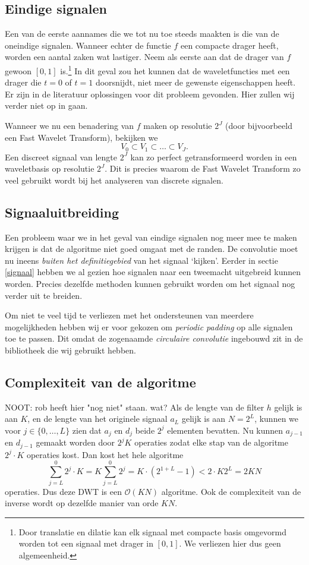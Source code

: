\documentclass[11pt]{uvamath}
\theoremstyle{plain}
\theoremstyle{definition}
\theoremstyle{remark}
\begin{document}
\subsection{Eindige signalen}
Een van de eerste aannames die we tot nu toe steeds maakten is die van de oneindige signalen. Wanneer echter de functie $f$ een compacte drager heeft, worden een aantal zaken wat lastiger. Neem als eerste aan dat de drager van $f$ gewoon $[0,1]$ is.\footnote{Door translatie en dilatie kan elk signaal met compacte basis omgevormd worden tot een signaal met drager in $[0,1]$. We verliezen hier dus geen algemeenheid.} In dit geval zou het kunnen dat de waveletfuncties met een drager die $t=0$ of $t=1$ doorsnijdt, niet meer de gewenste eigenschappen heeft. Er zijn in de literatuur oplossingen voor dit probleem gevonden. Hier zullen wij verder niet op in gaan.

Wanneer we nu een benadering van $f$ maken op resolutie $2^J$ (door bijvoorbeeld een Fast Wavelet Transform), bekijken we
\[
V_0 \subset V_{1} \subset \ldots \subset V_{J}.
\]
Een discreet signaal van lengte $2^{J}$ kan zo perfect getransformeerd worden in een waveletbasis op resolutie $2^{J}$. Dit is precies waarom de Fast Wavelet Transform zo veel gebruikt wordt bij het analyseren van discrete signalen.

\subsection{Signaaluitbreiding}
Een probleem waar we in het geval van eindige signalen nog meer mee te maken krijgen is dat de algoritme niet goed omgaat met de randen. De convolutie moet nu ineens \emph{buiten het definitiegebied} van het signaal `kijken'. Eerder in sectie \ref{signaal} hebben we al gezien hoe signalen naar een tweemacht uitgebreid kunnen worden. Precies dezelfde methoden kunnen gebruikt worden om het signaal nog verder uit te breiden.

Om niet te veel tijd te verliezen met het ondersteunen van meerdere mogelijkheden hebben wij er voor gekozen om \emph{periodic padding} op alle signalen toe te passen. Dit omdat de zogenaamde \emph{circulaire convolutie} ingebouwd zit in de bibliotheek die wij gebruikt hebben.

\subsection{Complexiteit van de algoritme}
NOOT: rob heeft hier "nog niet" staan. wat?
Als de lengte van de filter $h$ gelijk is aan $K$, en de lengte van het originele signaal $a_L$ gelijk is aan $N = 2^{L}$, kunnen we voor $j \in \{0, \ldots, L\}$ zien dat $a_j$ en $d_j$ beide $2^{j}$ elementen bevatten. Nu kunnen $a_{j-1}$ en $d_{j-1}$ gemaakt worden door $2^{j}K$ operaties zodat elke stap van de algoritme $2^{j} \cdot K$ operaties kost. Dan kost het hele algoritme
\[
\sum_{j=L}^0 2^{j} \cdot K = K \sum_{j=L}^0 2^{j} = K \cdot (2^{1+L} - 1) < 2 \cdot K 2^{L} = 2KN
\]
operaties. Dus deze DWT is een $\mathcal{O}(KN)$ algoritme. Ook de complexiteit van de inverse wordt op dezelfde manier van orde $KN$.
\end{document}

